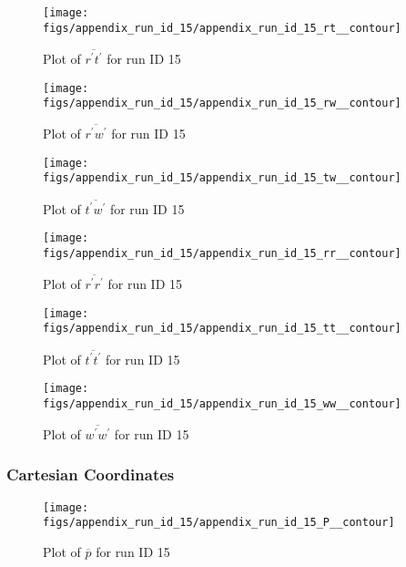\begin{figure}[H]
\centering
\texttt{[image: figs/appendix\_run\_id\_15/appendix\_run\_id\_15\_rt\_\_contour]}
\caption{Plot of $\overline{r^\prime t^\prime}$ for run ID 15}
\label{fig:appendix_run_id_15_rt__contour}
\end{figure}


\begin{figure}[H]
\centering
\texttt{[image: figs/appendix\_run\_id\_15/appendix\_run\_id\_15\_rw\_\_contour]}
\caption{Plot of $\overline{r^\prime w^\prime}$ for run ID 15}
\label{fig:appendix_run_id_15_rw__contour}
\end{figure}


\begin{figure}[H]
\centering
\texttt{[image: figs/appendix\_run\_id\_15/appendix\_run\_id\_15\_tw\_\_contour]}
\caption{Plot of $\overline{t^\prime w^\prime}$ for run ID 15}
\label{fig:appendix_run_id_15_tw__contour}
\end{figure}


\begin{figure}[H]
\centering
\texttt{[image: figs/appendix\_run\_id\_15/appendix\_run\_id\_15\_rr\_\_contour]}
\caption{Plot of $\overline{r^\prime r^\prime}$ for run ID 15}
\label{fig:appendix_run_id_15_rr__contour}
\end{figure}


\begin{figure}[H]
\centering
\texttt{[image: figs/appendix\_run\_id\_15/appendix\_run\_id\_15\_tt\_\_contour]}
\caption{Plot of $\overline{t^\prime t^\prime}$ for run ID 15}
\label{fig:appendix_run_id_15_tt__contour}
\end{figure}


\begin{figure}[H]
\centering
\texttt{[image: figs/appendix\_run\_id\_15/appendix\_run\_id\_15\_ww\_\_contour]}
\caption{Plot of $\overline{w^\prime w^\prime}$ for run ID 15}
\label{fig:appendix_run_id_15_ww__contour}
\end{figure}


\subsubsection{Cartesian Coordinates}
\begin{figure}[H]
\centering
\texttt{[image: figs/appendix\_run\_id\_15/appendix\_run\_id\_15\_P\_\_contour]}
\caption{Plot of $\overline{p}$ for run ID 15}
\label{fig:appendix_run_id_15_P__contour}
\end{figure}



